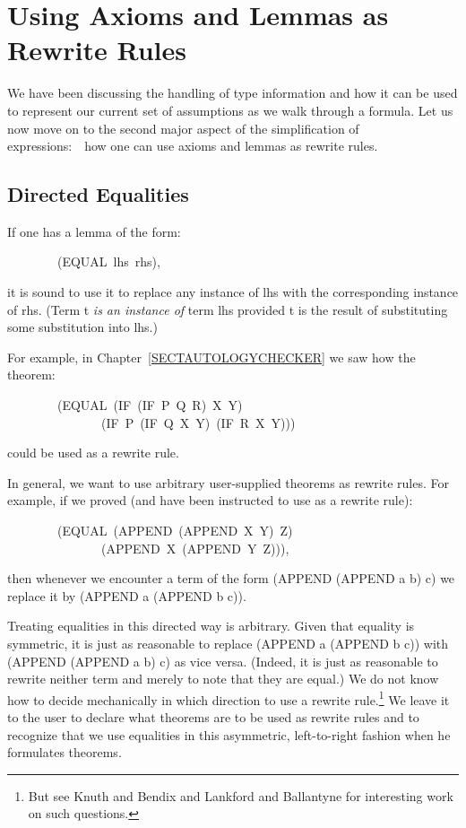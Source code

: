 \documentclass[11pt]{book}
\newenvironment{pubasis}{\begin{flushleft}\ttfamily\small}{\normalsize\rmfamily\end{flushleft}}
\newcommand{\pubinlineunderline}[1]{\emph{#1}}
\newcommand{\pubdefaulttextsize}{\large}
\begin{document}
\chapter{Using Axioms and Lemmas as Rewrite Rules}
\label{SECREWRITERULES}
\pubdefaulttextsize
We have been discussing the handling of type information and how
it can be used to represent our current set of assumptions as we
walk through a formula.
Let us now move on to the second major aspect of the simplification
of expressions:~~how one can use axioms and lemmas as rewrite rules.
\section{Directed Equalities}
\pubdefaulttextsize
If one has a lemma of the form:
\begin{pubasis}
~~~~~~~~(EQUAL~lhs~rhs),\\
\end{pubasis}
it is sound to use it to replace any instance of lhs with the
corresponding instance of rhs.
(Term t \pubinlineunderline{is an instance of} term lhs provided t is the result of
substituting some substitution into lhs.)

For example, in Chapter~\ref{SECTAUTOLOGYCHECKER} we saw how the theorem:
\begin{pubasis}
~~~~~~~~(EQUAL~(IF~(IF~P~Q~R)~X~Y)\\
~~~~~~~~~~~~~~~(IF~P~(IF~Q~X~Y)~(IF~R~X~Y)))\\
\end{pubasis}
could be used as a rewrite rule.

In general, we want to use arbitrary user-supplied theorems
as rewrite rules.
For example, if we proved (and have been instructed to
use as a rewrite rule):
\begin{pubasis}
~~~~~~~~(EQUAL~(APPEND~(APPEND~X~Y)~Z)\\
~~~~~~~~~~~~~~~(APPEND~X~(APPEND~Y~Z))),\\
\end{pubasis}
then whenever we encounter a term of the form
(APPEND (APPEND a b) c) we replace it by (APPEND a (APPEND b c)).

Treating equalities in this directed way is arbitrary.
Given that equality is symmetric, it is just as reasonable to replace
(APPEND a (APPEND b c)) with (APPEND (APPEND a b) c)
as vice versa.
(Indeed, it is
just as reasonable to rewrite neither term and merely to note
that they are equal.)  We do not know how to
decide mechanically in which direction
to use a rewrite rule.\footnote{But see Knuth and Bendix \cite{KNUTHBENDIX} and  Lankford and Ballantyne \cite{BALLANTYNE} for interesting work on such questions.}  We leave it to the user to declare what 
theorems are to be used as rewrite rules and to recognize that we
use equalities in this asymmetric, left-to-right fashion when he
formulates theorems.
\end{document}
